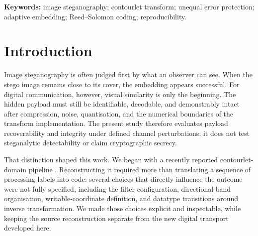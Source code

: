 \begin{abstract}
Robust hidden-image transport requires more than visually unobtrusive embedding: the payload must remain decodable and verifiably intact after channel perturbation. We evaluated a layered contourlet-domain transport under the preregistered FINAL-5J protocol using five internal configurations and two harmonized external baselines across \FinalPairs{} image pairs, \FinalEmbeddings{} embeddings, and \FinalEvaluations{} channel evaluations, with zero operational failures. The hierarchical design gave the most important image bits stronger protection and prioritized placement, but it did not improve complete recovery over the fixed-allocation reference; its measurable advantage was a small reduction in raw BER. Base-first placement showed no detectable independent benefit. One external baseline preserved substantially more partial payload information, whereas the hierarchical method achieved higher complete recovery than the second baseline, whose frozen clean-valid contract was infeasible for a subset of pairs. Payload and PSNR sweeps changed BER without moving the attacked complete-recovery boundary. These results define endpoint-specific trade-offs and a reproducible recovery boundary rather than a universal robustness advantage.
\end{abstract}

\noindent\textbf{Keywords:} image steganography; contourlet transform; unequal error protection; adaptive embedding; Reed--Solomon coding; reproducibility.

\section{Introduction}

Image steganography is often judged first by what an observer can see. When the stego image remains close to its cover, the embedding appears successful. For digital communication, however, visual similarity is only the beginning. The hidden payload must still be identifiable, decodable, and demonstrably intact after compression, noise, quantisation, and the numerical boundaries of the transform implementation. The present study therefore evaluates payload recoverability and integrity under defined channel perturbations; it does not test steganalytic detectability or claim cryptographic secrecy.

That distinction shaped this work. We began with a recently reported contourlet-domain pipeline \citep{Kumar2026}. Reconstructing it required more than translating a sequence of processing labels into code: several choices that directly influence the outcome were not fully specified, including the filter configuration, directional-band organisation, writable-coordinate definition, and datatype transitions around inverse transformation. We made those choices explicit and inspectable, while keeping the source reconstruction separate from the new digital transport developed here.

